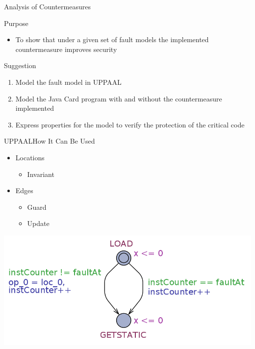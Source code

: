 
\begin{frame}{Analysis of Countermeasures}
\begin{block}{Purpose}
\begin{itemize}
\item To show that under a given set of fault models the implemented countermeasure improves security
\end{itemize}
\end{block}
\begin{block}{Suggestion}
\begin{enumerate}
\item Model the fault model in UPPAAL
\item Model the Java Card program with and without the countermeasure implemented
\item Express properties for the model to verify the protection of the critical code
\end{enumerate}
\end{block}
\end{frame}

\begin{frame}{UPPAAL}{How It Can Be Used}
\begin{itemize}
\item Locations
\begin{itemize}
\item Invariant
\end{itemize}
\item Edges
\begin{itemize}
\item Guard
\item Update
\end{itemize}
\end{itemize}
\begin{center}
\includegraphics[scale=0.3]{figures/uppaalExample.png}
\end{center}
\end{frame}

